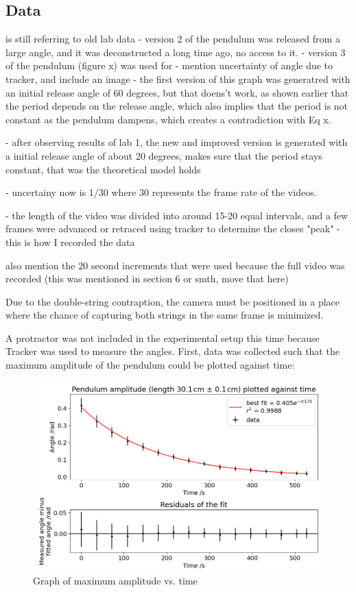 \documentclass[12pt]{article}
\begin{document}
\subsection{Data}
{\color{blue}
is still referring to old lab data
- version 2 of the pendulum was released from a large angle, and it was deconstructed a long time ago, no access to it.
- version 3 of the pendulum (figure x) was used for
- mention uncertainty of angle due to tracker, and include an image
- the first version of this graph was generatred with an initial release angle of 60 degrees, but that doens't work, as shown earlier that the period depends on the release angle, which also implies that the period is not constant as the pendulum dampens, which creates a contradiction with Eq x.

- after observing results of lab 1,  the new and improved version is generated with a initial release angle of about 20 degrees, makes sure that the period stays constant, that was the theoretical model holds

- uncertainy now is 1/30 where 30 represents the frame rate of the videos.

- the length of the video was divided into around 15-20 equal intervals, and a few frames were advanced or retraced using tracker to determine the closes "peak"  - this is how I recorded the data

also mention the 20 second increments that were used because the full video was recorded (this was mentioned in section 6 or smth, move that here)



}
Due to the double-string contraption, the camera must be positioned in a place where the chance of capturing both strings in the same frame is minimized.

A protractor was not included in the experimental setup this time because Tracker \cite{tracker} was used to measure the angles. First, data was collected such that the maximum amplitude of the pendulum could be plotted against time:

\begin{figure}[!hptb]
    \centering
    \includegraphics[width=\textwidth]{../figures/max_amplitude_vs_time.png}
    \caption{\centering Graph of maximum amplitude vs. time}
    \label{fig:figure 4}
\end{figure}
\end{document}

